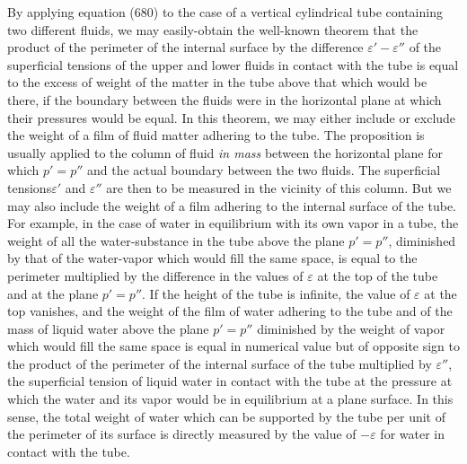 \documentclass[12pt]{article}
\begin{document}
By applying equation (680) to the case of a vertical cylindrical tube containing two different fluids, we may easily-obtain the well-known theorem that the product of the perimeter of the internal surface by the difference $\varepsilon' - \varepsilon''$ of the superficial tensions of the upper and lower fluids in contact with the tube is equal to the excess of weight of the matter in the tube above that which would be there, if the boundary between the fluids were in the horizontal plane at which their pressures would be equal. In this theorem, we may either include or exclude the weight of a film of fluid matter adhering to the tube. The proposition is usually applied to the column of fluid \textit{in mass} between the horizontal plane for which $p '=p''$ and the actual boundary between the two fluids. The superficial tensions$\varepsilon'$ and $\varepsilon''$ are then to be measured in the vicinity of this column. But we may also include the weight of a film adhering to the internal surface of the tube. For example, in the case of water in equilibrium with its own vapor in a tube, the weight of all the water-substance in the tube above the plane $p' =p''$, diminished by that of the water-vapor which would fill the same space, is equal to the perimeter multiplied by the difference in the values of $\varepsilon$ at the top of the tube and at the plane $p' =p''$. If the height of the tube is infinite, the value of $\varepsilon$ at the top vanishes, and the weight of the film of water adhering to the tube and of the mass of liquid water above the plane $p' =p''$ diminished by the weight of vapor which would fill the same space is equal in numerical value but of opposite sign to the product of the perimeter of the internal surface of the tube multiplied by $\varepsilon''$, the superficial tension of liquid water in contact with the tube at the pressure at which the water and its vapor would be in equilibrium at a plane surface. In this sense, the total weight of water which can be supported by the tube per unit of the perimeter of its surface is directly measured by the value of $-\varepsilon$ for water in contact with the tube.
\end{document}

